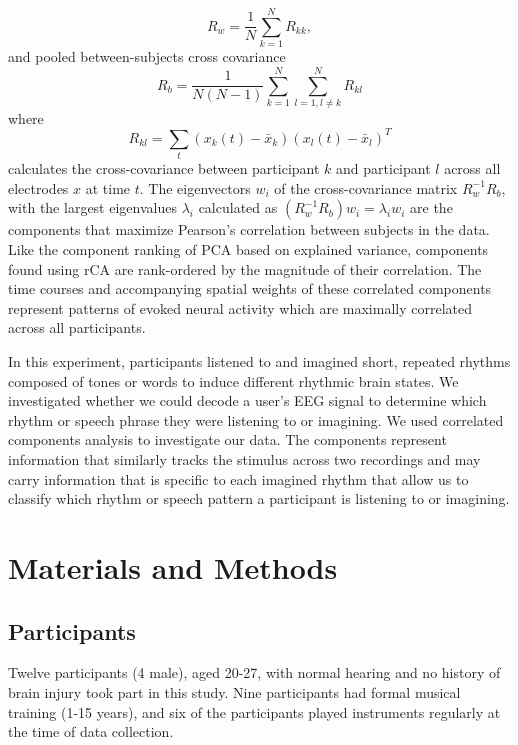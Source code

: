 \documentclass[utf8]{frontiersSCNS} %
\begin{document}
\begin{equation}
R_w=\frac{1}{N}\sum_{k=1}^{N} R_{kk},
\end{equation}
and pooled between-subjects cross covariance
\begin{equation}
R_b=\frac{1}{N(N-1)}\sum_{k=1}^{N}\sum_{l=1,l\neq{k}}^{N} R_{kl}
\end{equation}
where
\begin{equation}
R_{kl}=\sum_{t}(x_{k}(t)-\bar{x}_{k})(x_{l}(t)-\bar{x}_{l})^{T}
\end{equation}
calculates the cross-covariance between participant $k$ and participant $l$ across all electrodes $x$ at time $t$. The eigenvectors $w_{i}$ of the cross-covariance matrix $R_{w}^{-1}R_{b}$, with the largest eigenvalues $\lambda_{i}$ calculated as $(R_{w}^{-1}R_{b})w_{i} = \lambda_{i}w_{i}$ are the components that maximize Pearson's correlation between subjects in the data. Like the component ranking of PCA based on explained variance, components found using \ac{rCA} are rank-ordered by the magnitude of their correlation. 
The time courses and accompanying spatial weights of these correlated components represent patterns of evoked neural activity which are maximally correlated across all participants. 

In this experiment, participants listened to and imagined short, repeated rhythms composed of tones or words to induce different rhythmic brain states.
We investigated whether we could decode a user's \ac{EEG} signal to determine which rhythm or speech phrase they were listening to or imagining.
We used correlated components analysis to investigate our data.
The components represent information that similarly tracks the stimulus across two recordings and may carry information that is specific to each imagined rhythm that allow us to classify which rhythm or speech pattern a participant is listening to or imagining. 

\section{Materials and Methods}
\subsection{Participants}
Twelve participants (4 male), aged 20-27, with normal hearing and no history of brain injury took part in this study. Nine participants had formal musical training (1-15 years), and six of the participants played instruments regularly at the time of data collection.
\end{document}
